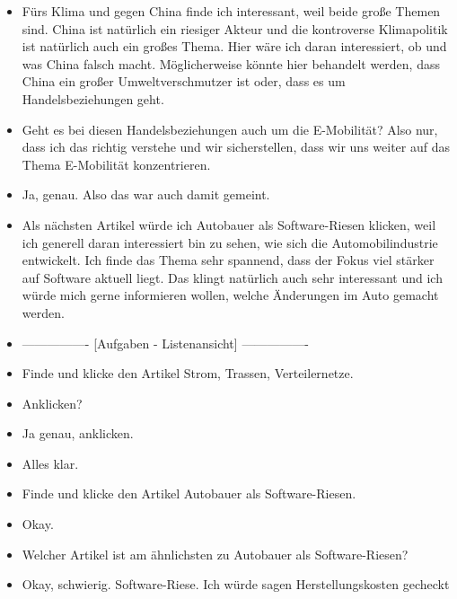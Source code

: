 {\begin{itemize}[]
                  Also ich habe im Vorfeld natürlich bereits ein bestimmtes Bild worum es gehen könnte bei den Titeln und wollte mir deswegen die Artikel anschauen.
            \item {} \flqq Fürs Klima und gegen China\frqq{} finde ich interessant, weil beide große Themen sind.
                  China ist natürlich ein riesiger Akteur und die kontroverse Klimapolitik ist natürlich auch ein großes Thema.
                  Hier wäre ich daran interessiert, ob und was China falsch macht.
                  Möglicherweise könnte hier behandelt werden, dass China ein großer Umweltverschmutzer ist oder, dass es um Handelsbeziehungen geht.
            \item {} Geht es bei diesen Handelsbeziehungen auch um die E-Mobilität?
                  Also nur, dass ich das richtig verstehe und wir sicherstellen, dass wir uns weiter auf das Thema E-Mobilität konzentrieren.
            \item {} Ja, genau. Also das war auch damit gemeint.
            \item {} Als nächsten Artikel würde ich \flqq Autobauer als Software-Riesen\frqq{} klicken, weil ich generell daran interessiert bin zu sehen, wie sich die Automobilindustrie entwickelt.
                  Ich finde das Thema sehr spannend, dass der Fokus viel stärker auf Software aktuell liegt.
                  Das klingt natürlich auch sehr interessant und ich würde mich gerne informieren wollen, welche Änderungen im Auto gemacht werden.
            \item {----------------} [Aufgaben - Listenansicht] {----------------}
            \item {} Finde und klicke den Artikel \flqq Strom, Trassen, Verteilernetze\frqq{}.
            \item {} Anklicken?
            \item {} Ja genau, anklicken.
            \item {} Alles klar.
            \item {} Finde und klicke den Artikel \flqq Autobauer als Software-Riesen\frqq{}.
            \item {} Okay.
            \item {} Welcher Artikel ist am ähnlichsten zu \flqq Autobauer als Software-Riesen\frqq{}?
            \item {} Okay, schwierig. Software-Riese. Ich würde sagen \flqq Herstellungskosten gecheckt\frqq{}

\end{itemize}}

